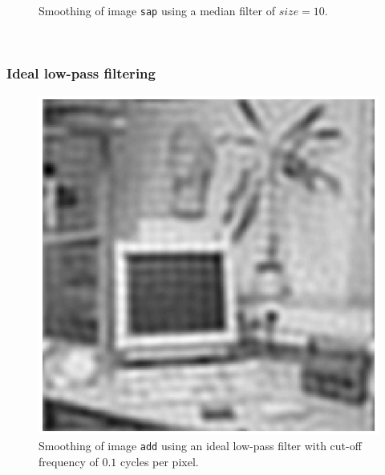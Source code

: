 \begin{minipage}{\linewidth}
\begin{minipage}{0.4\linewidth}
\begin{figure}[H]
      \caption{Smoothing of image \texttt{sap} using a median filter of $size=10$.}
      \label{fig:Q17_medfilt_sap_10}
    \end{figure}
  \end{minipage}
\end{minipage}
\\



\subsubsection{Ideal low-pass filtering}

\begin{minipage}{\linewidth}
  \begin{minipage}{0.4\linewidth}
    \begin{figure}[H]
      \includegraphics[scale=0.5]{./images/Q17/ideal/add_01.eps}
      \caption{Smoothing of image \texttt{add} using an ideal low-pass filter with cut-off frequency of $0.1$ cycles per pixel.}
      \label{fig:Q17_ideal_add_01}
    \end{figure}
  \end{minipage}
  \hspace{0.05\linewidth}
  \begin{minipage}{0.4\linewidth}
    \begin{figure}[H]

\end{figure}
\end{minipage}
\end{minipage}

